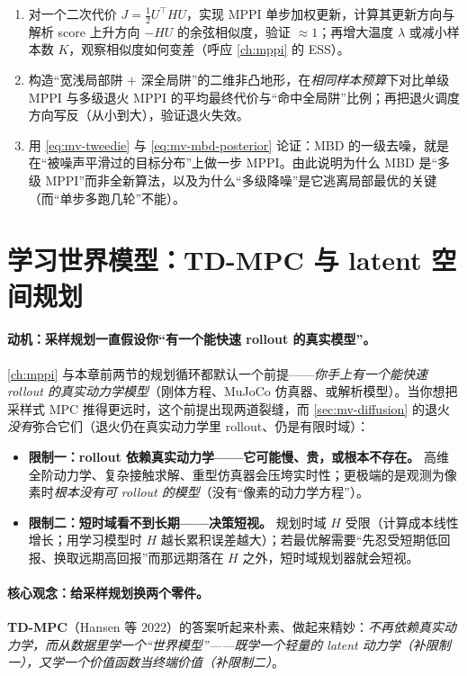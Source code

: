 \begin{practice}
\begin{enumerate}
  \item 对一个二次代价 $J=\tfrac12 U^\top H U$，实现 MPPI 单步加权更新，计算其更新方向与解析 score 上升方向 $-HU$ 的余弦相似度，验证 $\approx1$；再增大温度 $\lambda$ 或减小样本数 $K$，观察相似度如何变差（呼应 \cref{ch:mppi} 的 ESS）。
  \item 构造“宽浅局部阱 $+$ 深全局阱”的二维非凸地形，在\emph{相同样本预算}下对比单级 MPPI 与多级退火 MPPI 的平均最终代价与“命中全局阱”比例；再把退火调度方向写反（从小到大），验证退火失效。
  \item 用 \cref{eq:mv-tweedie} 与 \cref{eq:mv-mbd-posterior} 论证：MBD 的一级去噪，就是在“被噪声平滑过的目标分布”上做一步 MPPI。由此说明为什么 MBD 是“多级 MPPI”而非全新算法，以及为什么“多级降噪”是它逃离局部最优的关键（而“单步多跑几轮”不能）。
\end{enumerate}
\end{practice}

\section{学习世界模型：TD-MPC 与 latent 空间规划}
\label{sec:mv-tdmpc}

\paragraph{动机：采样规划一直假设你“有一个能快速 rollout 的真实模型”。}
\cref{ch:mppi} 与本章前两节的规划循环都默认一个前提——\emph{你手上有一个能快速 rollout 的真实动力学模型}（刚体方程、MuJoCo 仿真器、或解析模型）。当你想把采样式 MPC 推得更远时，这个前提出现两道裂缝，而 \cref{sec:mv-diffusion} 的退火\emph{没有}弥合它们（退火仍在真实动力学里 rollout、仍是有限时域）：
\begin{itemize}
  \item \textbf{限制一：rollout 依赖真实动力学——它可能慢、贵，或根本不存在。} 高维全阶动力学、复杂接触求解、重型仿真器会压垮实时性；更极端的是观测为像素时\emph{根本没有可 rollout 的模型}（没有“像素的动力学方程”）。
  \item \textbf{限制二：短时域看不到长期——决策短视。} 规划时域 $H$ 受限（计算成本线性增长；用学习模型时 $H$ 越长累积误差越大）；若最优解需要“先忍受短期低回报、换取远期高回报”而那远期落在 $H$ 之外，短时域规划器就会短视。
\end{itemize}

\paragraph{核心观念：给采样规划换两个零件。}
\textbf{TD-MPC}（Hansen 等 $2022$）的答案听起来朴素、做起来精妙：\emph{不再依赖真实动力学，而从数据里学一个“世界模型”——既学一个轻量的 latent 动力学（补限制一），又学一个价值函数当终端价值（补限制二）}\cite{hansen2022tdmpc}。

